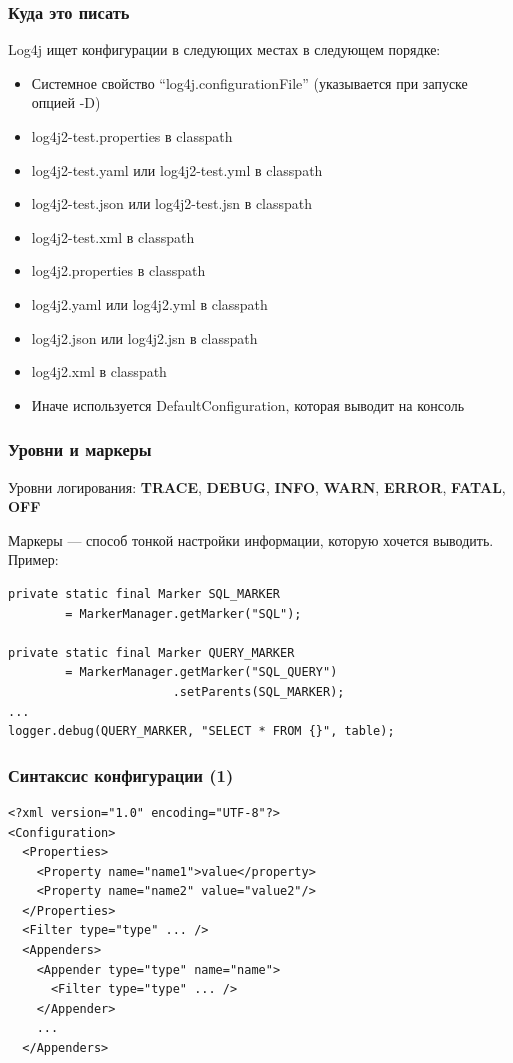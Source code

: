 \documentclass[xetex,mathserif,serif]{beamer}
\begin{document}
	\begin{frame}
		\frametitle{Куда это писать}
		Log4j ищет конфигурации в следующих местах в следующем порядке:
		\begin{itemize}
			\item Системное свойство ``log4j.configurationFile'' (указывается при запуске опцией -D)
			\item log4j2-test.properties в classpath
			\item log4j2-test.yaml или log4j2-test.yml в classpath
			\item log4j2-test.json или log4j2-test.jsn в classpath
			\item log4j2-test.xml в classpath
			\item log4j2.properties в classpath
			\item log4j2.yaml или log4j2.yml в classpath
			\item log4j2.json или log4j2.jsn в classpath
			\item log4j2.xml в classpath
			\item Иначе используется DefaultConfiguration, которая выводит на консоль
		\end{itemize}
	\end{frame}

	\begin{frame}[fragile]
		\frametitle{Уровни и маркеры}
		Уровни логирования: \textbf{TRACE}, \textbf{DEBUG}, \textbf{INFO}, \textbf{WARN}, \textbf{ERROR}, \textbf{FATAL}, \textbf{OFF}

		Маркеры --- способ тонкой настройки информации, которую хочется выводить. Пример:
		\begin{verbatim}
private static final Marker SQL_MARKER 
        = MarkerManager.getMarker("SQL");

private static final Marker QUERY_MARKER 
        = MarkerManager.getMarker("SQL_QUERY")
                       .setParents(SQL_MARKER);
...
logger.debug(QUERY_MARKER, "SELECT * FROM {}", table);
		\end{verbatim}
\end{frame}

	\begin{frame}[fragile]
		\frametitle{Синтаксис конфигурации (1)}
		\begin{verbatim}
<?xml version="1.0" encoding="UTF-8"?>
<Configuration>
  <Properties>
    <Property name="name1">value</property>
    <Property name="name2" value="value2"/>
  </Properties>
  <Filter type="type" ... />
  <Appenders>
    <Appender type="type" name="name">
      <Filter type="type" ... />
    </Appender>
    ...
  </Appenders>
		\end{verbatim}
	\end{frame}
\end{document}
